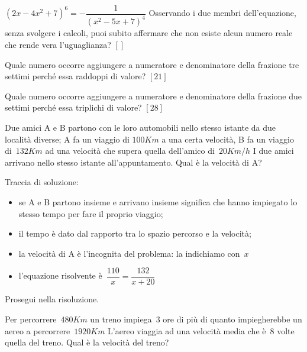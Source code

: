 \begin{esercizio}
\label{ese:20.29}
$\left(2x-4x^{2}+7\right)^{6}=-{\dfrac{1}{\left(x^{2}-5x+7\right)^{4}}}$ 
Osservando i due membri dell'equazione, senza svolgere i calcoli, puoi subito 
affermare che non esiste alcun numero reale che rende vera l'uguaglianza?
  \hfill $\left[\right]$
\end{esercizio}

\begin{esercizio}[\Ast]
\label{ese:20.30}
Quale numero occorre aggiungere a numeratore e denominatore della frazione 
tre settimi perché essa raddoppi di valore?
  \hfill $\left[21\right]$
\end{esercizio}

\begin{esercizio}[\Ast]
\label{ese:20.31}
Quale numero occorre aggiungere a numeratore e denominatore della frazione 
due settimi perché essa triplichi di valore?
  \hfill $\left[28\right]$
\end{esercizio}

\begin{esercizio}
\label{ese:20.32}
Due amici A e B partono con le loro automobili nello stesso istante da due 
località diverse; A fa un viaggio di $100\unit{Km}$ a una certa velocità, 
B fa un viaggio di~$132\unit{Km}$ ad una velocità che supera quella dell'amico 
di~$20\unit{Km/h}$
I due amici arrivano nello stesso istante all'appuntamento. 
Qual è la velocità di A?
\begin{center}
 
\end{center}
Traccia di soluzione:
\begin{itemize}
 \item se A e B partono insieme e arrivano insieme significa che hanno 
 impiegato lo stesso tempo per fare il proprio viaggio;
 \item il tempo è dato dal rapporto tra lo spazio percorso e la velocità;
 \item la velocità di A è l'incognita del problema: la indichiamo con~$x$
 \item l'equazione risolvente è~$\dfrac{110}{x}=\dfrac{132}{x+20}$
\end{itemize}
Prosegui nella risoluzione.
\end{esercizio}

\begin{esercizio}
\label{ese:20.33}
Per percorrere~$480\unit{Km}$ un treno impiega~$3$ ore di più di quanto 
impiegherebbe un aereo a percorrere~$1920\unit{Km}$
L'aereo viaggia ad una velocità media che è~$8$ volte quella del treno. 
Qual è la velocità del treno?
\end{esercizio}

